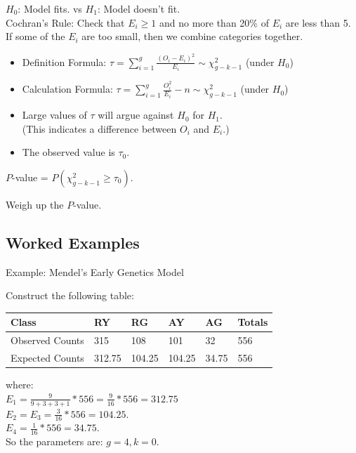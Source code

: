 \documentclass[t,xcolor=pdftex,dvipsnames,table]{beamer}\usepackage[]{graphicx}\usepackage[]{color}
\begin{document}
\begin{frame}[fragile]{}

 $H_{0}$: Model fits. vs $H_{1}$: Model doesn't fit. \\

 Cochran's Rule: Check that $E_{i} \geq 1$ and no more than 20\% of $E_{i}$ are less than 5. If some of the $E_{i}$ are too small, then we combine categories together.

\begin{itemize}
\item Definition Formula: $\tau = \sum_{i=1}^{g} \frac{(O_{i} - E_{i})^2}{E_{i}} \sim \chi^2_{g-k-1}$ (under $H_{0}$)
\item Calculation Formula: $\tau = \sum_{i=1}^{g} \frac{O_{i}^2}{E_{i}} - n \sim \chi^2_{g-k-1}$ (under $H_{0}$)
\item Large values of $\tau$ will argue against $H_{0}$ for $H_{1}$. \\  
(This indicates a difference between $O_{i}$ and $E_{i}$.)
\item The observed value is $\tau_{0}$. 
\end{itemize}

 $P$-value = $P( \chi^2_{g-k-1} \geq \tau_{0})$.

 Weigh up the $P$-value.
\end{frame}  


\subsection[GoodnessofFit]{Worked Examples}
\begin{frame}[fragile]{Example: Mendel's Early Genetics Model}

Construct the following table:

\begin{center}
\begin{tabular}{|l|llll|l|} \hline
Class & RY & RG & AY & AG  & Totals \\ \hline
Observed Counts & 315  & 108 & 101 & 32 & 556 \\
Expected Counts & 312.75   & 104.25  & 104.25  & 34.75  & 556 \\ \hline
\end{tabular}
\end{center}

where: \\
$E_{1} = \frac{9}{9+3+3+1}*556 = \frac{9}{16}*556 = 312.75$ \\
$E_{2} = E_{3} =  \frac{3}{16}*556  = 104.25$. \\
$E_{4} = \frac{1}{16}*556  = 34.75$.\\

So the parameters are: $g=4, k=0$.
\end{frame} 
\end{document}
